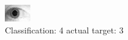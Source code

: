 \begin{figure}[h!]
\begin{center}
\includegraphics[width=0.60\columnwidth]{figures/ID1830_class_4_target_3.png}
\end{center}
\caption{ Classification: 4 actual target: 3}
\label{fig:ID1830_class_4_target_3}
\end{figure}
